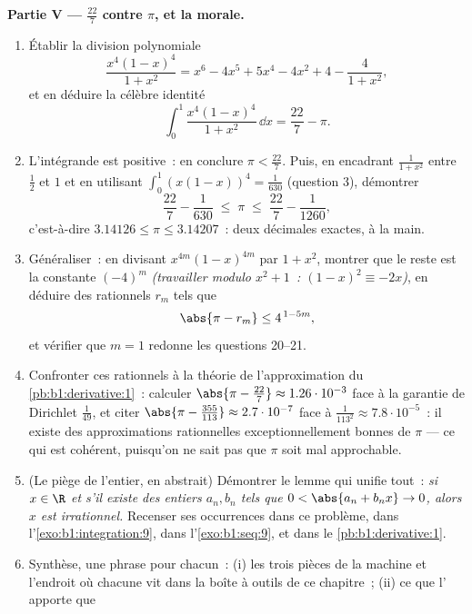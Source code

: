\begin{problem}
\medskip
\noindent\textbf{Partie V --- $\frac{22}{7}$ contre $\pi$, et la
morale.}
\begin{enumerate}[resume]
  \item Établir la division polynomiale
        \[
        \frac{x^4(1-x)^4}{1 + x^2}
        = x^6 - 4x^5 + 5x^4 - 4x^2 + 4 - \frac{4}{1 + x^2},
        \]
        et en déduire la célèbre identité
        \[
        \int_0^1 \frac{x^4 (1-x)^4}{1 + x^2}\,\dd x
        = \frac{22}{7} - \pi .
        \]
  \item L'intégrande est positive~: en conclure $\pi <
        \frac{22}{7}$. Puis, en encadrant $\frac{1}{1+x^2}$ entre
        $\frac12$ et $1$ et en utilisant $\int_0^1 (x(1-x))^4 =
        \frac{1}{630}$ (question 3), démontrer
        \[
        \frac{22}{7} - \frac{1}{630} \;\leq\; \pi \;\leq\;
        \frac{22}{7} - \frac{1}{1260} ,
        \]
        c'est-à-dire $3.14126 \leq \pi \leq 3.14207$~: deux
        décimales exactes, à la main.
  \item Généraliser~: en divisant $x^{4m}(1-x)^{4m}$ par $1 + x^2$,
        montrer que le reste est la constante $(-4)^m$
        \emph{(travailler modulo $x^2 + 1$~: $(1-x)^2 \equiv -2x$)},
        en déduire des rationnels $r_m$ tels que
        \[
        \abs{\pi - r_m} \leq 4^{\,1 - 5m} ,
        \]
        et vérifier que $m = 1$ redonne les questions 20--21.
  \item Confronter ces rationnels à la théorie de l'approximation du
        \cref{pb:b1:derivative:1}~: calculer $\abs{\pi -
        \frac{22}{7}} \approx 1.26\cdot10^{-3}$ face à la garantie
        de Dirichlet $\frac{1}{49}$, et citer
        $\abs{\pi - \frac{355}{113}} \approx 2.7\cdot10^{-7}$
        face à $\frac{1}{113^2} \approx 7.8\cdot10^{-5}$~: il
        existe des approximations rationnelles exceptionnellement
        bonnes de $\pi$ --- ce qui est cohérent, puisqu'on ne sait
        pas que $\pi$ soit mal approchable.
  \item (Le piège de l'entier, en abstrait) Démontrer le lemme qui
        unifie tout~: \emph{si $x \in \R$ et s'il existe des entiers
        $a_n, b_n$ tels que $0 < \abs{a_n + b_n x} \to 0$, alors $x$
        est irrationnel.} Recenser ses occurrences dans ce problème,
        dans l'\cref{exo:b1:integration:9}, dans
        l'\cref{exo:b1:seq:9}, et dans le \cref{pb:b1:derivative:1}.
  \item Synthèse, une phrase pour chacun~: (i) les trois pièces de
        la machine et l'endroit où chacune vit dans la boîte à
        outils de ce chapitre~; (ii) ce que l' apporte que

\end{enumerate}
\end{problem}
